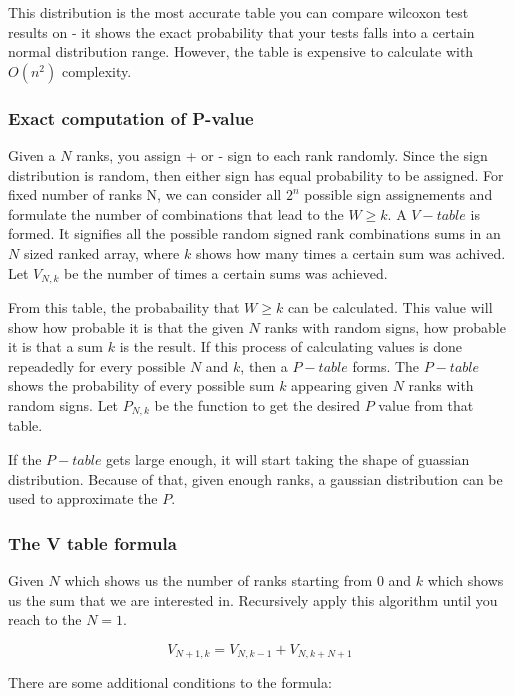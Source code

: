 \documentclass[12pt]{article}
\begin{document}
This distribution is the most accurate table you can compare wilcoxon test results on - it shows the exact probability that your tests falls into a certain normal distribution range. However, the table is expensive to calculate with $O(n^2)$ complexity.

\subsubsection{Exact computation of P-value}

Given a $N$ ranks, you assign + or - sign to each rank randomly. Since the sign distribution is random, then either sign has equal probability to be assigned. For fixed number of ranks N, we can consider all $2^n$ possible sign assignements and formulate the number of combinations that lead to the $W\geq k$. A $V-table$ is formed. It signifies all the possible random signed rank combinations sums in an $N$ sized ranked array, where $k$ shows how many times a certain sum was achived. Let $V_{N, k}$ be the number of times a certain sums was achieved.

From this table, the probabaility that $W\geq k$ can be calculated. This value will show how probable it is that the given $N$ ranks with random signs, how probable it is that a sum $k$ is the result. If this process of calculating values is done repeadedly for every possible $N$ and $k$, then a $P-table$ forms. The $P-table$ shows the probability of every possible sum $k$ appearing given $N$ ranks with random signs. Let $P_{N, k}$ be the function to get the desired $P$ value from that table.

If the $P-table$ gets large enough, it will start taking the shape of guassian distribution. Because of that, given enough ranks, a gaussian distribution can be used to approximate the $P$.

\subsubsection{The V table formula}

Given $N$ which shows us the number of ranks starting from $0$ and $k$ which shows us the sum that we are interested in. Recursively apply this algorithm until you reach to the $N = 1$.

\begin{equation}
  V_{N+1, k} = V_{N, k-1} + V_{N, k+N+1}
\end{equation}

There are some additional conditions to the formula:
\end{document}
